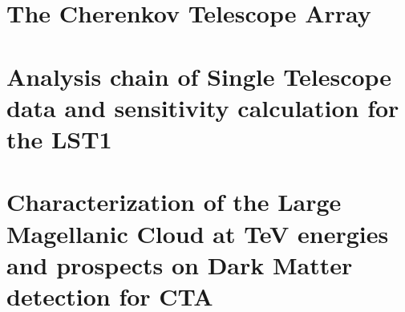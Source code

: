 \documentclass[12pt,fleqn,aas_macros]{book} %
\begin{document}

\chapter{The Cherenkov Telescope Array} \label{cap:CTA}




\chapter[Analysis chain of Single Telescope data and...]{Analysis chain of Single Telescope data and sensitivity calculation for the LST1} \label{cap:LST1}



\chapter[Characterization of the Large Magellanic Cloud...]{Characterization of the Large Magellanic Cloud at TeV energies and prospects on Dark Matter detection for CTA} \label{cap:LMC}



\printbibliography
\printglossaries
\end{document}
